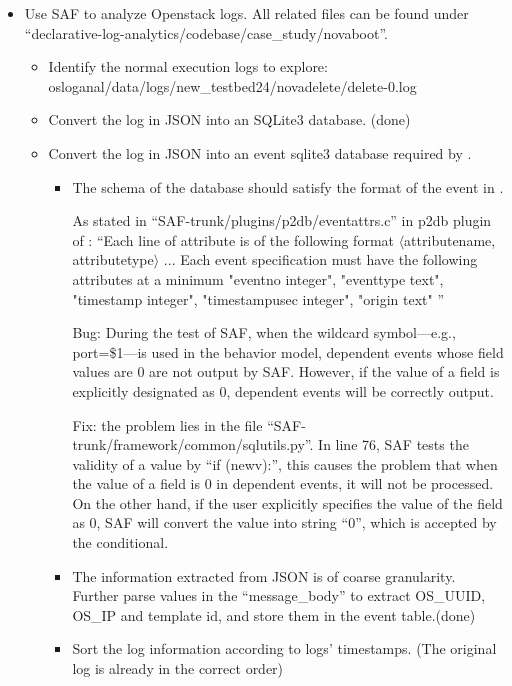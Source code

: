 \documentclass{article}
\begin{document}
\begin{itemize}
\item Use SAF to analyze Openstack logs. All related files can be found under
  ``declarative-log-analytics/codebase/case\_study/novaboot''.
  \begin{itemize}
  \item Identify the normal execution logs to explore: osloganal/data/logs/new\_testbed24/novadelete/delete-0.log
  \item Convert the log in JSON into an SQLite3 database. (done)
  \item Convert the log in JSON into an event sqlite3 database required by \saf{}.
    \begin{itemize}
    \item The schema of the database should satisfy the format of the event in
      \saf{}.
      
      As stated in ``SAF-trunk/plugins/p2db/eventattrs.c'' in p2db plugin of \saf{}: ``Each line of
      attribute is of the following format $\langle$attributename,
      attributetype$\rangle$ ... Each event specification must have the
      following attributes at a minimum "eventno integer", "eventtype text",
      "timestamp integer",	"timestampusec integer", "origin text" ''

      Bug: During the test of SAF, when the wildcard symbol---e.g.,
      port=\$1---is used in the behavior model, dependent events
      whose field values are 0 are not output by SAF. However, if the value of a
      field is explicitly designated as 0, dependent events will be correctly
      output.

      Fix: the problem lies in the file
      ``SAF-trunk/framework/common/sqlutils.py''. In line 76, SAF tests the
      validity of a value by ``if (newv):'', this causes the problem that when
      the value of a field is 0 in dependent events, it will not be
      processed. On the other hand, if the user explicitly specifies the value
      of the field as 0, SAF will convert the value into string ``0'', which
      is accepted by the conditional.
    \item The information extracted from JSON is of coarse granularity. Further
      parse values in the ``message\_body'' to extract OS\_UUID, OS\_IP and
      template id, and store them in the event table.(done)
      
    \item Sort the log information according to logs' timestamps. (The original
      log is already in the correct order)
    \end{itemize}


\end{itemize}
\end{itemize}
\end{document}
